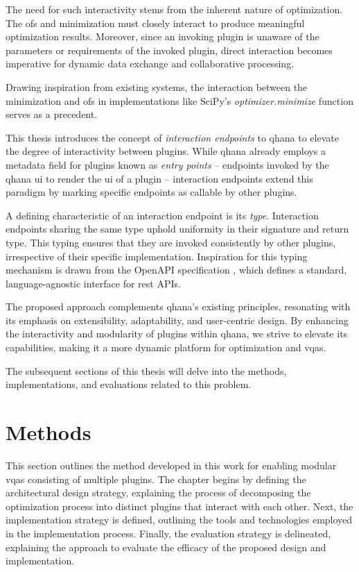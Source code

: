\documentclass[
  a4paper,  %
  twoside,  %
  bibliography=totoc,
  headsepline,
  cleardoublepage=empty,
  parskip=half,
  draft=false
]{scrbook}
\begin{document}
The need for such interactivity stems from the inherent nature of optimization.
The \glspl{of} and minimization must closely interact to produce meaningful optimization results.
Moreover, since an invoking plugin is unaware of the parameters or requirements of the invoked plugin, direct interaction becomes imperative for dynamic data exchange and collaborative processing.

Drawing inspiration from existing systems, the interaction between the minimization and \glspl{of} in implementations like SciPy's \emph{optimizer.minimize} \cite{Virtanen2020} function serves as a precedent.

This thesis introduces the concept of \emph{interaction endpoints} to \gls{qhana} to elevate the degree of interactivity between plugins.
While \gls{qhana} already employs a metadata field for plugins known as \emph{entry points} -- endpoints invoked by the \gls{qhana} \gls{ui} to render the \gls{ui} of a plugin -- interaction endpoints extend this paradigm by marking specific endpoints as callable by other plugins.

A defining characteristic of an interaction endpoint is its \emph{type}.
Interaction endpoints sharing the same type uphold uniformity in their signature and return type.
This typing ensures that they are invoked consistently by other plugins, irrespective of their specific implementation.
Inspiration for this typing mechanism is drawn from the OpenAPI specification \cite{Miller}, which defines a standard, language-agnostic interface for \gls{rest} APIs.

The proposed approach complements \gls{qhana}'s existing principles, resonating with its emphasis on extensibility, adaptability, and user-centric design.
By enhancing the interactivity and modularity of plugins within \gls{qhana}, we strive to elevate its capabilities, making it a more dynamic platform for optimization and \glspl{vqa}.

The subsequent sections of this thesis will delve into the methods, implementations, and evaluations related to this problem.


\chapter{Methods}
\label{chap:methodology}
This section outlines the method developed in this work for enabling modular \glspl{vqa} consisting of multiple plugins.
The chapter begins by defining the architectural design strategy, explaining the process of decomposing the optimization process into distinct plugins that interact with each other.
Next, the implementation strategy is defined, outlining the tools and technologies employed in the implementation process.
Finally, the evaluation strategy is delineated, explaining the approach to evaluate the efficacy of the proposed design and implementation.
\end{document}
